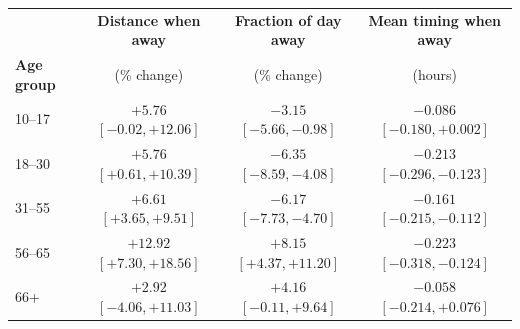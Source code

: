 \begin{tabular}{lccc}
\toprule
 & \textbf{Distance when away} & \textbf{Fraction of day away} & \textbf{Mean timing when away} \\
\textbf{Age group} & (\% change) & (\% change) & (hours) \\
\midrule
10--17 & $+5.76$ $[-0.02, +12.06]$ & $-3.15$ $[-5.66, -0.98]$ & $-0.086$ $[-0.180, +0.002]$ \\
18--30 & $+5.76$ $[+0.61, +10.39]$ & $-6.35$ $[-8.59, -4.08]$ & $-0.213$ $[-0.296, -0.123]$ \\
31--55 & $+6.61$ $[+3.65, +9.51]$ & $-6.17$ $[-7.73, -4.70]$ & $-0.161$ $[-0.215, -0.112]$ \\
56--65 & $+12.92$ $[+7.30, +18.56]$ & $+8.15$ $[+4.37, +11.20]$ & $-0.223$ $[-0.318, -0.124]$ \\
66+ & $+2.92$ $[-4.06, +11.03]$ & $+4.16$ $[-0.11, +9.64]$ & $-0.058$ $[-0.214, +0.076]$ \\
\bottomrule
\end{tabular}
